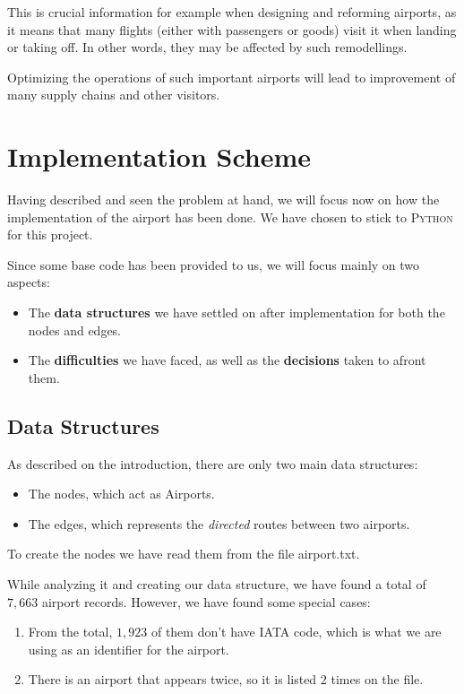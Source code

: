 \documentclass[10pt, a4paper]{article}
\begin{document}
This is crucial information for example when designing and reforming airports, as it means that many flights (either with passengers or goods) visit it when landing or taking off. In other words, they may be affected by such remodellings. 

Optimizing the operations of such important airports will lead to improvement of many supply chains and other visitors.

\section{Implementation Scheme}
Having described and seen the problem at hand, we will focus now on how the implementation of the airport has been done. We have chosen to stick to \textsc{Python} for this project.

Since some base code has been provided to us, we will focus mainly on two aspects:
\begin{itemize}
    \item The \textbf{data structures} we have settled on after implementation for both the nodes and edges.
    \item The \textbf{difficulties} we have faced, as well as the \textbf{decisions} taken to afront them.
\end{itemize}

\subsection{Data Structures}
As described on the introduction, there are only two main data structures:
\begin{itemize}
    \item The nodes, which act as Airports.
    \item The edges, which represents the \textit{directed} routes between two airports.
\end{itemize}

To create the nodes we have read them from the file {\selectfont airport.txt}.

While analyzing it and creating our data structure, we have found a total of $7,663$ airport records. However, we have found some special cases:
\begin{enumerate}
    \item From the total, $1,923$ of them don't have IATA code, which is what we are using as an identifier for the airport.
    \item There is an airport that appears twice, so it is listed $2$ times on the file.
\end{enumerate}
\end{document}
